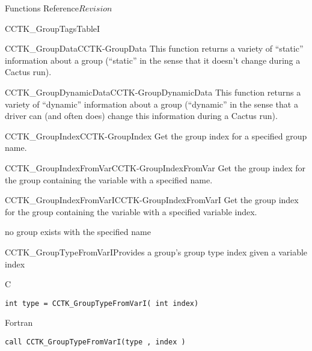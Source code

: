 \begin{cactuspart}{ Functions Reference}{}{$Revision$}
\begin{FunctionDescription}{CCTK\_GroupTagsTableI}
\begin{SeeAlsoSection}
\begin{SeeAlso2}{CCTK\_GroupData}{CCTK-GroupData}
This function returns a variety of ``static'' information about a group
(``static'' in the sense that it doesn't change during a Cactus run).
\end{SeeAlso2}
\begin{SeeAlso2}{CCTK\_GroupDynamicData}{CCTK-GroupDynamicData}
This function returns a variety of ``dynamic'' information about a group
(``dynamic'' in the sense that a driver can (and often does) change this
information during a Cactus run).
\end{SeeAlso2}
\begin{SeeAlso2}{CCTK\_GroupIndex}{CCTK-GroupIndex}
Get the group index for a specified group name.
\end{SeeAlso2}
\begin{SeeAlso2}{CCTK\_GroupIndexFromVar}{CCTK-GroupIndexFromVar}
Get the group index for the group containing the variable with
a specified name.
\end{SeeAlso2}
\begin{SeeAlso2}{CCTK\_GroupIndexFromVarI}{CCTK-GroupIndexFromVarI}
Get the group index for the group containing the variable with
a specified variable index.
\end{SeeAlso2}
\end{SeeAlsoSection}

\begin{ErrorSection}
\begin{Error}{-1}
no group exists with the specified name
\end{Error}
\end{ErrorSection}
\end{FunctionDescription}



\begin{FunctionDescription}{CCTK\_GroupTypeFromVarI}{Provides a group's group type
               index given a variable index}
\label{CCTK-GroupTypeFromVarI}
\begin{SynopsisSection}
\begin{Synopsis}{C}
\begin{verbatim}int type = CCTK_GroupTypeFromVarI( int index)\end{verbatim}
\end{Synopsis}
\begin{Synopsis}{Fortran}
\begin{verbatim}call CCTK_GroupTypeFromVarI(type , index )


\end{verbatim}
\end{Synopsis}
\end{SynopsisSection}
\end{FunctionDescription}
\end{cactuspart}
